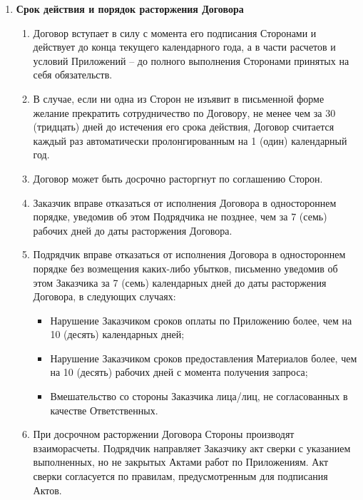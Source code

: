 \documentclass[14pt,a4paper]{article}
\begin{document}
\begin{enumerate}
	\item
	\begin{center}
	\textbf{Срок действия и порядок расторжения Договора}
	\end{center}
	\begin{enumerate}
		\item Договор вступает в силу с момента его подписания Сторонами и действует до конца текущего календарного года, а в части расчетов и условий Приложений – до полного выполнения Сторонами принятых на себя обязательств.
		
		\item В случае, если ни одна из Сторон не изъявит в письменной форме желание прекратить сотрудничество по Договору, не менее чем за 30 (тридцать) дней до истечения его срока действия, Договор считается каждый раз автоматически пролонгированным на 1 (один) календарный год.
		
		\item Договор может быть досрочно расторгнут по соглашению Сторон.
		
		\item Заказчик вправе отказаться от исполнения Договора в одностороннем порядке, уведомив об этом Подрядчика не позднее, чем за 7 (семь) рабочих дней до даты расторжения Договора.
		
		\item Подрядчик вправе отказаться от исполнения Договора в одностороннем порядке без возмещения каких-либо убытков, письменно уведомив об этом Заказчика за 7 (семь) календарных дней до даты расторжения Договора, в следующих случаях:
		\begin{itemize}
			\item Нарушение Заказчиком сроков оплаты по Приложению более, чем на 10 (десять) календарных дней;
			
			\item Нарушение Заказчиком сроков предоставления Материалов более, чем на 10 (десять) рабочих дней с момента получения запроса;
			
			\item Вмешательство со стороны Заказчика лица/лиц, не согласованных в качестве Ответственных.
		\end{itemize}

		\item При досрочном расторжении Договора Стороны производят взаиморасчеты. Подрядчик направляет Заказчику акт сверки с указанием выполненных, но не закрытых Актами работ по Приложениям. Акт сверки согласуется по правилам, предусмотренным для подписания Актов.
	\end{enumerate}


\end{enumerate}
\end{document}
